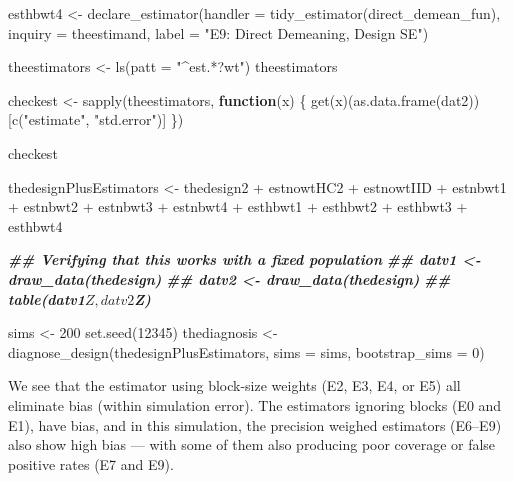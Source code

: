 \documentclass[
  12pt,
]{book}
\newenvironment{Shaded}{\begin{snugshade}}{\end{snugshade}}
\newcommand{\AttributeTok}[1]{\textcolor[rgb]{0.77,0.63,0.00}{#1}}
\newcommand{\ControlFlowTok}[1]{\textcolor[rgb]{0.13,0.29,0.53}{\textbf{#1}}}
\newcommand{\DecValTok}[1]{\textcolor[rgb]{0.00,0.00,0.81}{#1}}
\newcommand{\DocumentationTok}[1]{\textcolor[rgb]{0.56,0.35,0.01}{\textbf{\textit{#1}}}}
\newcommand{\FunctionTok}[1]{\textcolor[rgb]{0.00,0.00,0.00}{#1}}
\newcommand{\NormalTok}[1]{#1}
\newcommand{\OtherTok}[1]{\textcolor[rgb]{0.56,0.35,0.01}{#1}}
\newcommand{\SpecialCharTok}[1]{\textcolor[rgb]{0.00,0.00,0.00}{#1}}
\newcommand{\StringTok}[1]{\textcolor[rgb]{0.31,0.60,0.02}{#1}}
\theoremstyle{definition}
\theoremstyle{definition}
\theoremstyle{definition}
\theoremstyle{remark}
\begin{document}
\begin{Shaded}
\begin{Highlighting}[]
\NormalTok{esthbwt4 }\OtherTok{\textless{}{-}} \FunctionTok{declare\_estimator}\NormalTok{(}\AttributeTok{handler =} \FunctionTok{tidy\_estimator}\NormalTok{(direct\_demean\_fun), }\AttributeTok{inquiry =}\NormalTok{ theestimand, }\AttributeTok{label =} \StringTok{"E9: Direct Demeaning, Design SE"}\NormalTok{)}

\NormalTok{theestimators }\OtherTok{\textless{}{-}} \FunctionTok{ls}\NormalTok{(}\AttributeTok{patt =} \StringTok{"\^{}est.*?wt"}\NormalTok{)}
\NormalTok{theestimators}

\NormalTok{checkest }\OtherTok{\textless{}{-}} \FunctionTok{sapply}\NormalTok{(theestimators, }\ControlFlowTok{function}\NormalTok{(x) \{}
  \FunctionTok{get}\NormalTok{(x)(}\FunctionTok{as.data.frame}\NormalTok{(dat2))[}\FunctionTok{c}\NormalTok{(}\StringTok{"estimate"}\NormalTok{, }\StringTok{"std.error"}\NormalTok{)]}
\NormalTok{\})}

\NormalTok{checkest}

\NormalTok{thedesignPlusEstimators }\OtherTok{\textless{}{-}}\NormalTok{ thedesign2 }\SpecialCharTok{+}
\NormalTok{  estnowtHC2 }\SpecialCharTok{+}\NormalTok{ estnowtIID }\SpecialCharTok{+}\NormalTok{ estnbwt1 }\SpecialCharTok{+}\NormalTok{ estnbwt2 }\SpecialCharTok{+}\NormalTok{ estnbwt3 }\SpecialCharTok{+}\NormalTok{ estnbwt4 }\SpecialCharTok{+}
\NormalTok{  esthbwt1 }\SpecialCharTok{+}\NormalTok{ esthbwt2 }\SpecialCharTok{+}\NormalTok{ esthbwt3 }\SpecialCharTok{+}\NormalTok{ esthbwt4}

\DocumentationTok{\#\# Verifying that this works with a fixed population}
\DocumentationTok{\#\# datv1 \textless{}{-} draw\_data(thedesign)}
\DocumentationTok{\#\# datv2 \textless{}{-} draw\_data(thedesign)}
\DocumentationTok{\#\# table(datv1$Z,datv2$Z)}
\end{Highlighting}
\end{Shaded}

\begin{Shaded}
\begin{Highlighting}[]
\NormalTok{sims }\OtherTok{\textless{}{-}} \DecValTok{200}
\FunctionTok{set.seed}\NormalTok{(}\DecValTok{12345}\NormalTok{)}
\NormalTok{thediagnosis }\OtherTok{\textless{}{-}} \FunctionTok{diagnose\_design}\NormalTok{(thedesignPlusEstimators, }\AttributeTok{sims =}\NormalTok{ sims, }\AttributeTok{bootstrap\_sims =} \DecValTok{0}\NormalTok{)}
\end{Highlighting}
\end{Shaded}

We see that the estimator using block-size weights (E2, E3, E4, or E5)
all eliminate bias (within simulation error). The estimators ignoring
blocks (E0 and E1), have bias, and in this simulation, the precision
weighed estimators (E6--E9) also show high bias --- with some of them
also producing poor coverage or false positive rates (E7 and E9).
\end{document}
